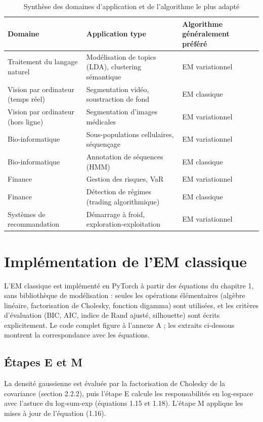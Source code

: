 \begin{table}[H]
\centering
\small
\setlength{\tabcolsep}{0.14cm}
\begin{tabular}{|p{4.84cm}|p{4.84cm}|p{4.84cm}|}
\hline
\textbf{Domaine} & \textbf{Application type} & \textbf{Algorithme généralement préféré} \\
\hline
Traitement du langage naturel & Modélisation de topics (LDA), clustering sémantique & EM variationnel \\
\hline
Vision par ordinateur (temps réel) & Segmentation vidéo, soustraction de fond & EM classique \\
\hline
Vision par ordinateur (hors ligne) & Segmentation d'images médicales & EM variationnel \\
\hline
Bio-informatique & Sous-populations cellulaires, séquençage & EM variationnel \\
\hline
Bio-informatique & Annotation de séquences (HMM) & EM classique \\
\hline
Finance & Gestion des risques, VaR & EM variationnel \\
\hline
Finance & Détection de régimes (trading algorithmique) & EM classique \\
\hline
Systèmes de recommandation & Démarrage à froid, exploration-exploitation & EM variationnel \\
\hline
\end{tabular}
\caption{Synthèse des domaines d'application et de l'algorithme le plus adapté}
\label{tab:3_1}
\end{table}
\section{Implémentation de l'EM classique}
L'EM classique est implémenté en PyTorch à partir des équations du chapitre 1, sans bibliothèque de modélisation : seules les opérations élémentaires (algèbre linéaire, factorisation de Cholesky, fonction digamma) sont utilisées, et les critères d'évaluation (BIC, AIC, indice de Rand ajusté, silhouette) sont écrits explicitement. Le code complet figure à l'annexe A ; les extraits ci-dessous montrent la correspondance avec les équations.

\subsection{Étapes E et M}
La densité gaussienne est évaluée par la factorisation de Cholesky de la covariance (section 2.2.2), puis l'étape E calcule les responsabilités en log-espace avec l'astuce du log-sum-exp (équations 1.15 et 1.18). L'étape M applique les mises à jour de l'équation (1.16).

